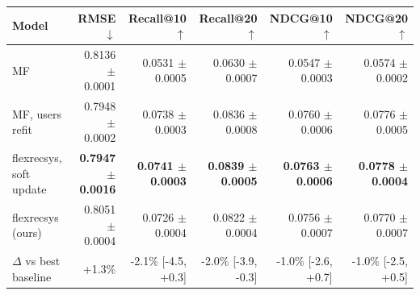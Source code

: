 \begin{tabular}{lrrrrr}
\toprule
Model & RMSE $\downarrow$ & Recall@10 $\uparrow$ & Recall@20 $\uparrow$ & NDCG@10 $\uparrow$ & NDCG@20 $\uparrow$ \\
\midrule
MF & 0.8136 $\pm$ 0.0001 & 0.0531 $\pm$ 0.0005 & 0.0630 $\pm$ 0.0007 & 0.0547 $\pm$ 0.0003 & 0.0574 $\pm$ 0.0002 \\
MF, users refit & 0.7948 $\pm$ 0.0002 & 0.0738 $\pm$ 0.0003 & 0.0836 $\pm$ 0.0008 & 0.0760 $\pm$ 0.0006 & 0.0776 $\pm$ 0.0005 \\
flexrecsys, soft update & \textbf{0.7947 $\pm$ 0.0016} & \textbf{0.0741 $\pm$ 0.0003} & \textbf{0.0839 $\pm$ 0.0005} & \textbf{0.0763 $\pm$ 0.0006} & \textbf{0.0778 $\pm$ 0.0004} \\
flexrecsys (ours) & 0.8051 $\pm$ 0.0004 & 0.0726 $\pm$ 0.0004 & 0.0822 $\pm$ 0.0004 & 0.0756 $\pm$ 0.0007 & 0.0770 $\pm$ 0.0007 \\
\midrule
$\Delta$ vs best baseline & +1.3\% & -2.1\% [-4.5, +0.3] & -2.0\% [-3.9, -0.3] & -1.0\% [-2.6, +0.7] & -1.0\% [-2.5, +0.5] \\
\bottomrule
\end{tabular}
